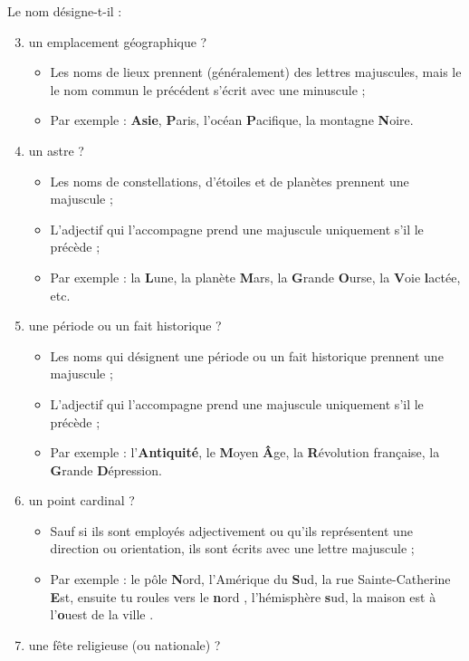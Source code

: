 \documentclass[10pt, french]{article}
\begin{document}
\begin{multicols*}{2}
Le nom désigne-t-il :
\begin{enumerate}
	\setcounter{enumi}{2}
	\item	un emplacement géographique ?
		\begin{itemize}
		\item	Les noms de lieux prennent (généralement) des lettres majuscules, mais le le nom commun le précédent s'écrit avec une minuscule ;
		\item	Par exemple : \textbf{Asie}, \textbf{P}aris, l'océan \textbf{P}acifique, la montagne \textbf{N}oire.
		\end{itemize}
	\item	un astre ?
		\begin{itemize}
		\item	Les noms de constellations, d'étoiles et de planètes prennent une majuscule ;
		\item	L'adjectif qui l'accompagne prend une majuscule uniquement s'il le précède ;
		\item	Par exemple : la \textbf{L}une, la planète \textbf{M}ars, la \textbf{G}rande \textbf{O}urse, la \textbf{V}oie \textbf{l}actée, etc.
		\end{itemize}
	\item	une période ou un fait historique ?
		\begin{itemize}
		\item	Les noms qui désignent une période ou un fait historique prennent une majuscule ;
		\item	L'adjectif qui l'accompagne prend une majuscule uniquement s'il le précède ;
		\item	Par exemple : l'\textbf{Antiquité}, le \textbf{M}oyen \textbf{Â}ge, la \textbf{R}évolution française, la \textbf{G}rande \textbf{D}épression.
		\end{itemize}
	\item	un point cardinal ?
		\begin{itemize}
		\item	Sauf si ils sont employés adjectivement ou qu'ils représentent une direction ou orientation, ils sont écrits avec une lettre majuscule ;
		\item	Par exemple : le pôle \textbf{N}ord, l'Amérique du \textbf{S}ud, la rue Sainte-Catherine \textbf{E}st, \og ensuite tu roules vers le \textbf{n}ord \fg{}, l'hémisphère \textbf{s}ud, \og la maison est à l'\textbf{o}uest de la ville \fg{}.
		\end{itemize}
	\item	une fête religieuse (ou nationale) ?

\end{enumerate}
\end{multicols*}
\end{document}

